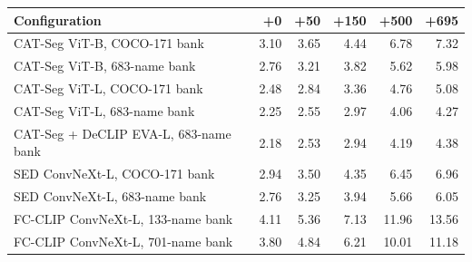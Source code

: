 \begin{tabular}{@{}lrrrrr@{}}
\toprule
Configuration & +0 & +50 & +150 & +500 & +695 \\
\midrule
CAT-Seg ViT-B, COCO-171 bank & 3.10 & 3.65 & 4.44 & 6.78 & 7.32 \\
CAT-Seg ViT-B, 683-name bank & 2.76 & 3.21 & 3.82 & 5.62 & 5.98 \\
CAT-Seg ViT-L, COCO-171 bank & 2.48 & 2.84 & 3.36 & 4.76 & 5.08 \\
CAT-Seg ViT-L, 683-name bank & 2.25 & 2.55 & 2.97 & 4.06 & 4.27 \\
CAT-Seg + DeCLIP EVA-L, 683-name bank & 2.18 & 2.53 & 2.94 & 4.19 & 4.38 \\
SED ConvNeXt-L, COCO-171 bank & 2.94 & 3.50 & 4.35 & 6.45 & 6.96 \\
SED ConvNeXt-L, 683-name bank & 2.76 & 3.25 & 3.94 & 5.66 & 6.05 \\
FC-CLIP ConvNeXt-L, 133-name bank & 4.11 & 5.36 & 7.13 & 11.96 & 13.56 \\
FC-CLIP ConvNeXt-L, 701-name bank & 3.80 & 4.84 & 6.21 & 10.01 & 11.18 \\
\bottomrule
\end{tabular}
